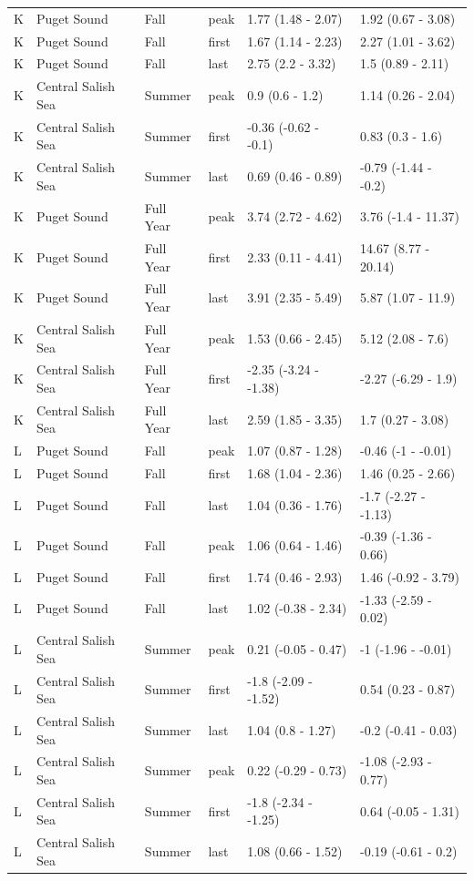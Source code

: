 \documentclass{article}
\begin{document}
\begin{table}[ht]
\begin{tabular}{|p{}|p{}|p{}|p{}|p{}|p{}|}
   \hline
K & Puget Sound & Fall & peak & 1.77 (1.48 - 2.07) & 1.92 (0.67 - 3.08) \\ 
  K & Puget Sound & Fall & first & 1.67 (1.14 - 2.23) & 2.27 (1.01 - 3.62) \\ 
  K & Puget Sound & Fall & last & 2.75 (2.2 - 3.32) & 1.5 (0.89 - 2.11) \\ 
   \hline
K & Central Salish Sea & Summer & peak & 0.9 (0.6 - 1.2) & 1.14 (0.26 - 2.04) \\ 
  K & Central Salish Sea & Summer & first & -0.36 (-0.62 - -0.1) & 0.83 (0.3 - 1.6) \\ 
  K & Central Salish Sea & Summer & last & 0.69 (0.46 - 0.89) & -0.79 (-1.44 - -0.2) \\ 
   \hline
K & Puget Sound & Full Year & peak & 3.74 (2.72 - 4.62) & 3.76 (-1.4 - 11.37) \\ 
  K & Puget Sound & Full Year & first & 2.33 (0.11 - 4.41) & 14.67 (8.77 - 20.14) \\ 
  K & Puget Sound & Full Year & last & 3.91 (2.35 - 5.49) & 5.87 (1.07 - 11.9) \\ 
   \hline
K & Central Salish Sea & Full Year & peak & 1.53 (0.66 - 2.45) & 5.12 (2.08 - 7.6) \\ 
  K & Central Salish Sea & Full Year & first & -2.35 (-3.24 - -1.38) & -2.27 (-6.29 - 1.9) \\ 
  K & Central Salish Sea & Full Year & last & 2.59 (1.85 - 3.35) & 1.7 (0.27 - 3.08) \\ 
   \hline
L & Puget Sound & Fall & peak & 1.07 (0.87 - 1.28) & -0.46 (-1 - -0.01) \\ 
  L & Puget Sound & Fall & first & 1.68 (1.04 - 2.36) & 1.46 (0.25 - 2.66) \\ 
  L & Puget Sound & Fall & last & 1.04 (0.36 - 1.76) & -1.7 (-2.27 - -1.13) \\ 
  L & Puget Sound & Fall & peak & 1.06 (0.64 - 1.46) & -0.39 (-1.36 - 0.66) \\ 
  L & Puget Sound & Fall & first & 1.74 (0.46 - 2.93) & 1.46 (-0.92 - 3.79) \\ 
  L & Puget Sound & Fall & last & 1.02 (-0.38 - 2.34) & -1.33 (-2.59 - 0.02) \\ 
  L & Central Salish Sea & Summer & peak & 0.21 (-0.05 - 0.47) & -1 (-1.96 - -0.01) \\ 
  L & Central Salish Sea & Summer & first & -1.8 (-2.09 - -1.52) & 0.54 (0.23 - 0.87) \\ 
  L & Central Salish Sea & Summer & last & 1.04 (0.8 - 1.27) & -0.2 (-0.41 - 0.03) \\ 
  L & Central Salish Sea & Summer & peak & 0.22 (-0.29 - 0.73) & -1.08 (-2.93 - 0.77) \\ 
  L & Central Salish Sea & Summer & first & -1.8 (-2.34 - -1.25) & 0.64 (-0.05 - 1.31) \\ 
  L & Central Salish Sea & Summer & last & 1.08 (0.66 - 1.52) & -0.19 (-0.61 - 0.2) \\ 
  \end{tabular}
\endgroup
\end{table}
\end{document}
